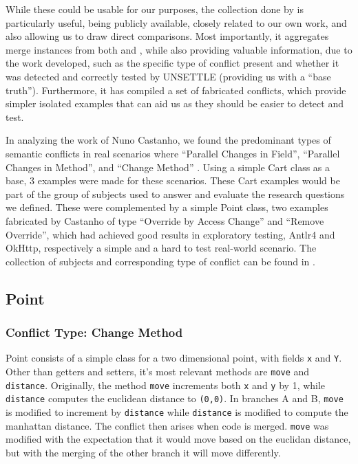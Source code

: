 While these could be usable for our purposes, the collection done by \citet{kn:nuno} is particularly useful, being publicly available, closely related to our own work, and also allowing us to draw direct comparisons. Most importantly, it aggregates merge instances from both \citet{kn:leuson} and \citet{kn:safemerge}, while also providing valuable information, due to the work developed, such as the specific type of conflict present and whether it was detected and correctly tested by UNSETTLE (providing us with a ``base truth''). Furthermore, it has compiled a set of fabricated conflicts, which provide simpler isolated examples that can aid us as they should be easier to detect and test.

In analyzing the work of Nuno Castanho, we found the predominant types of semantic conflicts in real scenarios where ``Parallel Changes in Field'', ``Parallel Changes in Method'', and ``Change Method'' \cite{kn:nuno}.  Using a simple Cart class as a base, 3 examples were made for these scenarios.
These Cart examples would be part of the group of subjects used to answer and evaluate the research questions we defined. These were complemented by a simple Point class, two examples fabricated by Castanho of type ``Override by Access Change'' and ``Remove Override'', which had achieved good results in exploratory testing, Antlr4 and OkHttp, respectively a simple and a hard to test real-world scenario.
The collection of subjects and corresponding type of conflict can be found in .


\subsection{Point}

\subsubsection{Conflict Type: Change Method}

Point consists of a simple class for a two dimensional point, with fields \texttt{x} and \texttt{Y}.
Other than getters and setters, it's most relevant methods are \texttt{move} and \texttt{distance}.
Originally, the method \texttt{move} increments both \texttt{x} and \texttt{y} by 1, while \texttt{distance} computes the euclidean distance to \texttt{(0,0)}.
In branches A and B, \texttt{move} is modified to increment by \texttt{distance} while \texttt{distance} is modified to compute
the manhattan distance.  The conflict then arises when code is merged.  \texttt{move} was modified with the expectation that it would move
based on the euclidan distance, but with the merging of the other branch it will move differently.

